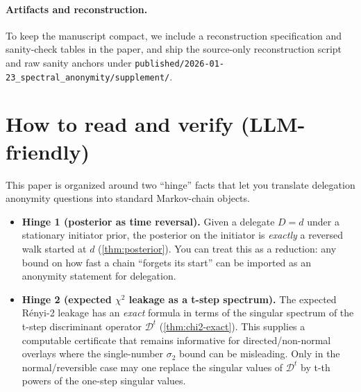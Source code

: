 \documentclass[11pt]{article}
\newcommand{\cD}{\mathcal{D}}
\begin{document}
\paragraph{Artifacts and reconstruction.}
To keep the manuscript compact, we include a reconstruction specification and
sanity-check tables in the paper, and ship the source-only reconstruction script
and raw sanity anchors under
\texttt{published/2026-01-23\_spectral\_anonymity/supplement/}.


\section{How to read and verify (LLM-friendly)}\label{sec:howtoread}
This paper is organized around two ``hinge'' facts that let you translate
delegation anonymity questions into standard Markov-chain objects.

\begin{itemize}[leftmargin=1.2em]
\item \textbf{Hinge 1 (posterior as time reversal).} Given a delegate $D=d$ under
a stationary initiator prior, the posterior on the initiator is \emph{exactly}
a reversed walk started at $d$ (\cref{thm:posterior}). You can treat this as a
reduction: any bound on how fast a chain ``forgets its start'' can be imported
as an anonymity statement for delegation.
\item \textbf{Hinge 2 (expected $\chi^2$ leakage as a t-step spectrum).} The expected
R\'enyi-2 leakage has an \emph{exact} formula in terms of the singular spectrum
of the t-step discriminant operator $\cD^t$ (\cref{thm:chi2-exact}). This supplies a computable
certificate that remains informative for directed/non-normal overlays where the
single-number $\sigma_2$ bound can be misleading. Only in the normal/reversible case may one replace the singular values of $\cD^t$ by t-th powers of the one-step singular values.
\end{itemize}
\end{document}
